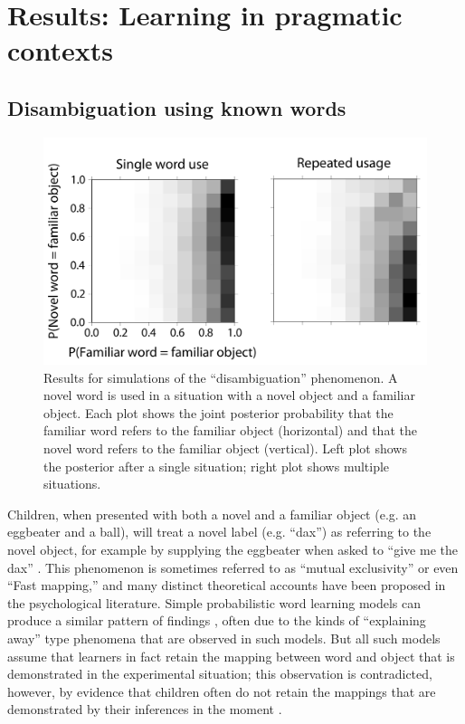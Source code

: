 \documentclass{article} %
\begin{document}
\section{Results: Learning in pragmatic contexts}


\subsection{Disambiguation using known words}

\begin{figure}
  \centering
\includegraphics[width=.6\textwidth]{figures/ME-composite-small.pdf}
  \caption{Results for simulations of the ``disambiguation'' phenomenon. A novel word is used in a situation with a novel object and a familiar object. Each plot shows the joint posterior probability that the familiar word refers to the familiar object (horizontal) and that the novel word refers to the familiar object (vertical). Left plot shows the posterior after a single situation; right plot shows multiple situations. 
}
  \label{fig:me}
\end{figure}

Children, when presented with both a novel and a familiar object (e.g. an eggbeater and a ball), will treat a novel label (e.g. ``dax'') as referring to the novel object, for example by supplying the eggbeater when asked to ``give me the dax'' \cite{markman1988}. This phenomenon is sometimes referred to as ``mutual exclusivity'' or even ``Fast mapping,'' and many distinct theoretical accounts have been proposed in the psychological literature. Simple probabilistic word learning models can produce a similar pattern of findings \cite{frank2009}, often due to the kinds of ``explaining away'' type phenomena that are observed in such models. But all such models assume that learners in fact retain the mapping between word and object that is demonstrated in the experimental situation; this observation is contradicted, however, by evidence that children often do not retain the mappings that are demonstrated by their inferences in the moment \cite{horst2008}. 
\end{document}
